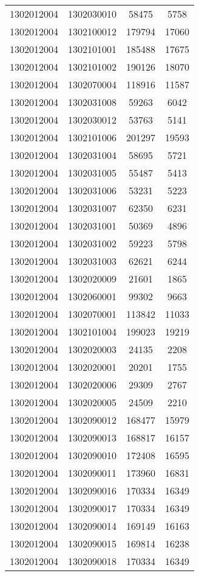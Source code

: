 \begin{longtable}{llcc}
1302012004 & 1302030010 & 58475 & 5758\\
1302012004 & 1302100012 & 179794 & 17060\\
1302012004 & 1302101001 & 185488 & 17675\\
1302012004 & 1302101002 & 190126 & 18070\\
1302012004 & 1302070004 & 118916 & 11587\\
1302012004 & 1302031008 & 59263 & 6042\\
1302012004 & 1302030012 & 53763 & 5141\\
1302012004 & 1302101006 & 201297 & 19593\\
1302012004 & 1302031004 & 58695 & 5721\\
1302012004 & 1302031005 & 55487 & 5413\\
1302012004 & 1302031006 & 53231 & 5223\\
1302012004 & 1302031007 & 62350 & 6231\\
1302012004 & 1302031001 & 50369 & 4896\\
1302012004 & 1302031002 & 59223 & 5798\\
1302012004 & 1302031003 & 62621 & 6244\\
1302012004 & 1302020009 & 21601 & 1865\\
1302012004 & 1302060001 & 99302 & 9663\\
1302012004 & 1302070001 & 113842 & 11033\\
1302012004 & 1302101004 & 199023 & 19219\\
1302012004 & 1302020003 & 24135 & 2208\\
1302012004 & 1302020001 & 20201 & 1755\\
1302012004 & 1302020006 & 29309 & 2767\\
1302012004 & 1302020005 & 24509 & 2210\\
1302012004 & 1302090012 & 168477 & 15979\\
1302012004 & 1302090013 & 168817 & 16157\\
1302012004 & 1302090010 & 172408 & 16595\\
1302012004 & 1302090011 & 173960 & 16831\\
1302012004 & 1302090016 & 170334 & 16349\\
1302012004 & 1302090017 & 170334 & 16349\\
1302012004 & 1302090014 & 169149 & 16163\\
1302012004 & 1302090015 & 169814 & 16238\\
1302012004 & 1302090018 & 170334 & 16349\\

\end{longtable}
